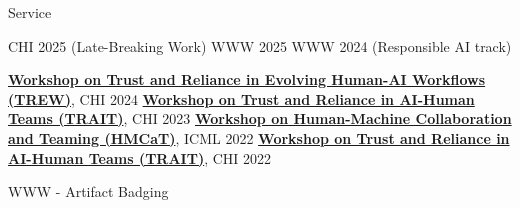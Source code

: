 \begin{rubric}{Service}

    \entry*[2025] CHI 2025 (Late-Breaking Work)
    \entry*[2024] WWW 2025
    \entry*[2024] WWW 2024 (Responsible AI track)

    \entry*[2024] \textbf{\href{https://chi-trew.github.io/}{Workshop on Trust and Reliance in Evolving Human-AI Workflows (TREW)}}, CHI 2024
    \entry*[2023] \textbf{\href{https://chi-trait.github.io/}{Workshop on Trust and Reliance in AI-Human Teams (TRAIT)}}, CHI 2023
    \entry*[2022] \textbf{\href{https://sites.google.com/view/icml-2022-hmcat/home}{Workshop on Human-Machine Collaboration and Teaming (HMCaT)}}, ICML 2022
    \entry*[2022] \textbf{\href{https://chi-trait.github.io/}{Workshop on Trust and Reliance in AI-Human Teams (TRAIT)}}, CHI 2022

    \entry*[2024 -- 2025] WWW - Artifact Badging
\end{rubric}